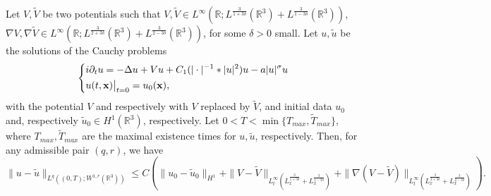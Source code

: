 \documentclass[10pt, leqno]{amsart}
\newcommand{\R}{\mathbb{R}}
\newcommand{\xb}{\boldsymbol{\rm{x}}}
\newcommand{\pare}[1]{\left(#1\right)}
\def\d{{\partial}}
\newcommand{\eps}{\varepsilon}
\begin{document}
\begin{theorem}
Let $V, \tilde V$ be two potentials such that $V, \tilde V\in L^\infty(\R; L^{\frac{3}{1+3\delta}}(\R^3)+L^{\frac{3}{1-3\delta}}(\R^3))$,
$\nabla V, \nabla\tilde V\in L^\infty(\R; L^{\frac{3}{2+3\delta}}(\R^3)+L^{\frac{3}{2-3\delta}}(\R^3))$, for some $\delta>0$ small.
Let $u, \tilde u$ be the solutions of the Cauchy problems
\begin{equation*}
\left\{\begin{aligned}
&i\partial_tu=-\Delta u+V u+C_1(|\cdot|^{-1}\ast|u|^2)u-a|u|^\sigma u\\
&u(t,\xb)\big|_{t=0}=u_0(\xb),
\end{aligned}\right.
\end{equation*}
  with the potential $V$ and respectively with $V$ replaced by $\tilde V$, and initial data $u_0$ and, respectively $\tilde u_0\in H^1(\R^3)$, respectively. Let $0<T<\min\{T_{max}, \tilde T_{max}\}$, where $T_{max}, \tilde T_{max}$ are the maximal existence times for $u, \tilde u$, respectively. Then, for any admissible pair $(q, r)$, we have
\begin{equation}\label{eq:stab1}
\|u-\tilde u\|_{L^q((0, T); W^{1, r}(\R^3))}\leq C\pare{
\|u_0-\tilde u_0\|_{H^1}+\|V-\tilde V\|_{L^\infty_t(L^{\frac{3}{1+3\delta}}_x+L^{\frac{3}{1-3\delta}}_x)}
+\|\nabla(V-\tilde V)\|_{L^\infty_t(L^{\frac{3}{2+3\delta}}_x+L^{\frac{3}{2-3\delta}}_x)}}.
\end{equation}
\end{theorem}
\end{document}
